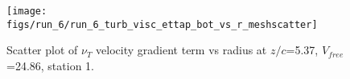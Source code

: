 \begin{figure}[H]
\centering
\texttt{[image: figs/run\_6/run\_6\_turb\_visc\_ettap\_bot\_vs\_r\_meshscatter]}
\caption{Scatter plot of $\nu_T$ velocity gradient term vs radius at $z/c$=5.37, $V_{free}$=24.86, station 1.}
\label{fig:run_6_turb_visc_ettap_bot_vs_r_meshscatter}
\end{figure}


